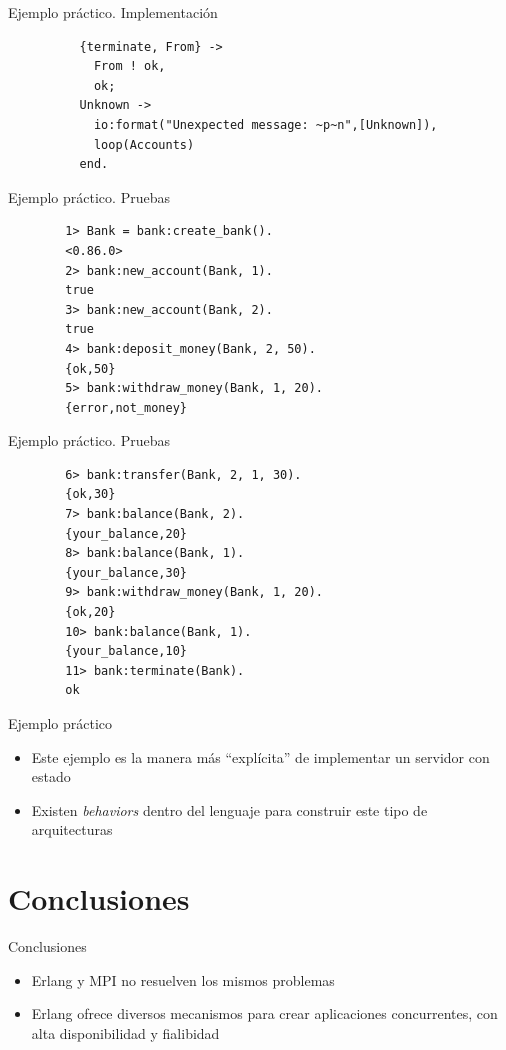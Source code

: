 \documentclass{beamer}
\begin{document}
    \begin{frame}[fragile]{Ejemplo práctico. Implementación}
      \begin{verbatim}
          {terminate, From} ->
            From ! ok,
            ok;
          Unknown ->
            io:format("Unexpected message: ~p~n",[Unknown]),
            loop(Accounts)
          end.
      \end{verbatim}
    \end{frame}

    \begin{frame}[fragile]{Ejemplo práctico. Pruebas}
      \begin{verbatim}
        1> Bank = bank:create_bank().
        <0.86.0>
        2> bank:new_account(Bank, 1).
        true
        3> bank:new_account(Bank, 2).
        true
        4> bank:deposit_money(Bank, 2, 50).
        {ok,50}
        5> bank:withdraw_money(Bank, 1, 20).
        {error,not_money}
      \end{verbatim}
    \end{frame}

    \begin{frame}[fragile]{Ejemplo práctico. Pruebas}
      \begin{verbatim}
        6> bank:transfer(Bank, 2, 1, 30).
        {ok,30}
        7> bank:balance(Bank, 2).
        {your_balance,20}
        8> bank:balance(Bank, 1).
        {your_balance,30}
        9> bank:withdraw_money(Bank, 1, 20).
        {ok,20}
        10> bank:balance(Bank, 1).
        {your_balance,10}
        11> bank:terminate(Bank).
        ok
      \end{verbatim}
    \end{frame}

    \begin{frame}{Ejemplo práctico}
      \begin{itemize}
        \item Este ejemplo es la manera más ``explícita'' de implementar
        un servidor con estado
        \item Existen \textit{behaviors} dentro del lenguaje para construir
        este tipo de arquitecturas
      \end{itemize}
    \end{frame}

  \section{Conclusiones}
    \begin{frame}{Conclusiones}
      \begin{itemize}
        \item Erlang y MPI no resuelven los mismos problemas
        \item Erlang ofrece diversos mecanismos para crear aplicaciones
        concurrentes, con alta disponibilidad y fialibidad
      \end{itemize}
    \end{frame}
\end{document}
